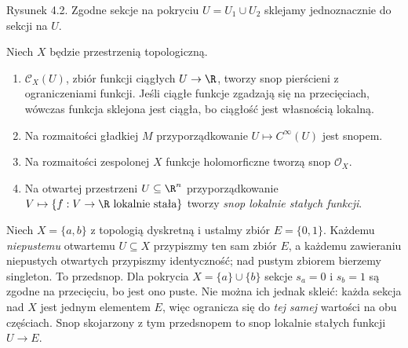 \begin{center}

{\small Rysunek 4.2. Zgodne sekcje na pokryciu $U=U_1\cup U_2$ sklejamy jednoznacznie do sekcji na $U$.}\par
\end{center}

\begin{przyklad}
Niech $X$ będzie przestrzenią topologiczną.
\begin{enumerate}[label=\alph*)]
\item $\mathcal C_X(U)$, zbiór funkcji ciągłych $U\to\R$,
tworzy snop pierścieni z ograniczeniami funkcji.
Jeśli ciągłe funkcje zgadzają się na przecięciach,
wówczas funkcja sklejona jest ciągła, bo ciągłość
jest własnością lokalną.
\item Na rozmaitości gładkiej $M$ przyporządkowanie
$U\mapsto C^\infty(U)$ jest snopem.
\item Na rozmaitości zespolonej $X$ funkcje holomorficzne
tworzą snop $\mathcal O_X$.
\item Na otwartej przestrzeni $U\subseteq\R^n$ przyporządkowanie
$V\mapsto\{f:V\to\R\ \text{lokalnie stała}\}$
tworzy \emph{snop lokalnie stałych funkcji}.
\end{enumerate}
\end{przyklad}

\begin{przyklad}
\label{prz:presheaf-not-sheaf}
Niech $X=\{a,b\}$ z topologią dyskretną i ustalmy
zbiór $E=\{0,1\}$. Każdemu \emph{niepustemu}
otwartemu $U\subseteq X$ przypiszmy ten sam zbiór $E$,
a każdemu zawieraniu niepustych otwartych przypiszmy
identyczność; nad pustym zbiorem bierzemy singleton.
To przedsnop. Dla pokrycia $X=\{a\}\cup\{b\}$
sekcje $s_a=0$ i $s_b=1$ są zgodne na przecięciu,
bo jest ono puste. Nie można ich jednak skleić:
każda sekcja nad $X$ jest jednym elementem $E$,
więc ogranicza się do \emph{tej samej} wartości
na obu częściach. Snop skojarzony z tym przedsnopem
to snop lokalnie stałych funkcji $U\to E$.
\end{przyklad}

